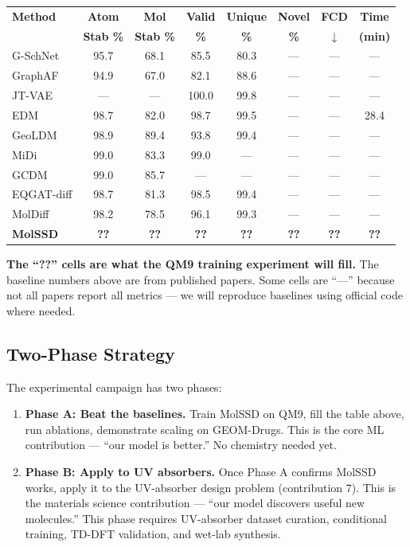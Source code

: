 \documentclass[12pt,a4paper]{article}
\begin{document}
\begin{center}
\renewcommand{\arraystretch}{1.25}
\small
\begin{tabular}{lccccccc}
\toprule
\textbf{Method} & \textbf{Atom} & \textbf{Mol} & \textbf{Valid} & \textbf{Unique} & \textbf{Novel} & \textbf{FCD} & \textbf{Time} \\
 & \textbf{Stab \%} & \textbf{Stab \%} & \textbf{\%} & \textbf{\%} & \textbf{\%} & $\downarrow$ & \textbf{(min)} \\
\midrule
G-SchNet & 95.7 & 68.1 & 85.5 & 80.3 & --- & --- & --- \\
GraphAF & 94.9 & 67.0 & 82.1 & 88.6 & --- & --- & --- \\
JT-VAE & --- & --- & 100.0 & 99.8 & --- & --- & --- \\
EDM & 98.7 & 82.0 & 98.7 & 99.5 & --- & --- & 28.4 \\
GeoLDM & 98.9 & 89.4 & 93.8 & 99.4 & --- & --- & --- \\
MiDi & 99.0 & 83.3 & 99.0 & --- & --- & --- & --- \\
GCDM & 99.0 & 85.7 & --- & --- & --- & --- & --- \\
EQGAT-diff & 98.7 & 81.3 & 98.5 & 99.4 & --- & --- & --- \\
MolDiff & 98.2 & 78.5 & 96.1 & 99.3 & --- & --- & --- \\
\midrule
\textbf{MolSSD} & \textbf{??} & \textbf{??} & \textbf{??} & \textbf{??} & \textbf{??} & \textbf{??} & \textbf{??} \\
\bottomrule
\end{tabular}
\end{center}

\textbf{The ``??'' cells are what the QM9 training experiment will fill.} The baseline numbers above are from published papers. Some cells are ``---'' because not all papers report all metrics --- we will reproduce baselines using official code where needed.

\subsection{Two-Phase Strategy}

The experimental campaign has two phases:

\begin{enumerate}
  \item \textbf{Phase A: Beat the baselines.} Train MolSSD on QM9, fill the table above, run ablations, demonstrate scaling on GEOM-Drugs. This is the core ML contribution --- ``our model is better.'' No chemistry needed yet.

  \item \textbf{Phase B: Apply to UV absorbers.} Once Phase A confirms MolSSD works, apply it to the UV-absorber design problem (contribution 7). This is the materials science contribution --- ``our model discovers useful new molecules.'' This phase requires UV-absorber dataset curation, conditional training, TD-DFT validation, and wet-lab synthesis.
\end{enumerate}
\end{document}

